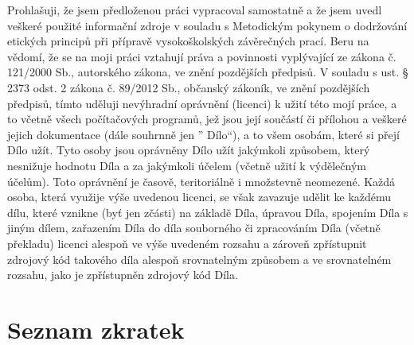 \documentclass[czech,bachelor,unicode]{ctufit-thesis}
\theoremstyle{plain}
\theoremstyle{definition}
\theoremstyle{remark}
\numberwithin{theorem}{chapter}
\begin{document}
\begin{declarationpage}
Prohlašuji, že jsem předloženou práci vypracoval samostatně a že jsem uvedl
veškeré použité informační zdroje v souladu s Metodickým pokynem o dodržování etických principů při přípravě vysokoškolských závěrečných prací.
Beru na vědomí, že se na moji práci vztahují práva a povinnosti vyplývající
ze zákona č. 121/2000 Sb., autorského zákona, ve znění pozdějších předpisů.
V souladu s ust. § 2373 odst. 2 zákona č. 89/2012 Sb., občanský zákoník, ve
znění pozdějších předpisů, tímto uděluji nevýhradní oprávnění (licenci) k užití
této mojí práce, a to včetně všech počítačových programů, jež jsou její součástí
či přílohou a veškeré jejich dokumentace (dále souhrnně jen ”
Dílo“), a to všem
osobám, které si přejí Dílo užít. Tyto osoby jsou oprávněny Dílo užít jakýmkoli
způsobem, který nesnižuje hodnotu Díla a za jakýmkoli účelem (včetně užití
k výdělečným účelům). Toto oprávnění je časově, teritoriálně i množstevně
neomezené. Každá osoba, která využije výše uvedenou licenci, se však zavazuje udělit ke každému dílu, které vznikne (byť jen zčásti) na základě Díla,
úpravou Díla, spojením Díla s jiným dílem, zařazením Díla do díla souborného
či zpracováním Díla (včetně překladu) licenci alespoň ve výše uvedeném rozsahu a zároveň zpřístupnit zdrojový kód takového díla alespoň srovnatelným
způsobem a ve srovnatelném rozsahu, jako je zpřístupněn zdrojový kód Díla.
\end{declarationpage}

\printabstractpage %

\chapter{Seznam zkratek}
\end{document}
